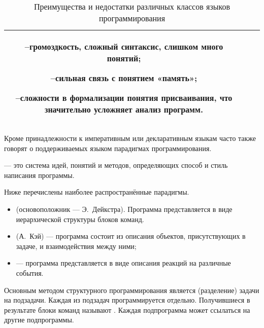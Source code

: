 \begin{table}
\begin{centering}
\begin{tabular}{|c|c|c|}
\begin{minipage}[t]{0.42\columnwidth}
        --\enskip громоздкость, сложный синтаксис, слишком много
        понятий;
        
        --\enskip сильная связь с понятием «память»;
        
        --\enskip сложности в формализации понятия присваивания, что
        значительно усложняет анализ программ.
        \par\medskip
      \end{minipage}\\
      \hline 
    \end{tabular}
    \par
  \end{centering}
  
  \caption{Преимущества и недостатки различных классов языков программирования}
  \label{tbl:PLclasses}
\end{table}

Кроме принадлежности к императивным или декларативным языкам часто
также говорят о поддерживаемых языком парадигмах программирования.

\begin{defn}
   — это
  система идей, понятий и методов, определяющих способ и стиль
  написания программы.
\end{defn}

Ниже перечислены наиболее распространённые парадигмы.

\begin{itemize}
\item {} (основоположник — Э.~Дейкстра). Программа
  представляется в виде иерархической структуры блоков команд.
\item
   (А.~Кэй) — программа состоит из описания
  объектов, присутствующих в задаче, и взаимодействия между ними;
\item
   — программа представляется в виде описания
  реакций на различные события.
\end{itemize}

Основным методом структурного программирования является
 (разделение) задачи на
подзадачи. Каждая из подзадач программируется отдельно. Получившиеся в
результате блоки команд называют .
Каждая подпрограмма может ссылаться на другие подпрограммы.

